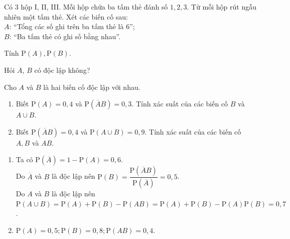 \begin{baitap}%
	Có $3$ hộp I, II, III. Mỗi hộp chứa ba tấm thẻ đánh số $1,2,3$. Từ mỗi hộp rút ngẫu nhiên một tấm thẻ. Xét các biến cố sau:\\
	$A$: ``Tổng các số ghi trên ba tấm thẻ là $6$'';\\
	$B$: ``Ba tấm thẻ có ghi số bằng nhau''.
	\begin{listEX}
		\item Tính $\mathrm{P}(A), \mathrm{P}(B)$.
		\item Hỏi $A$, $B$ có độc lập không?
	\end{listEX}
\end{baitap} 


\begin{baitap}%
	Cho $A$ và $B$ là hai biến cố độc lập với nhau.
	\begin{enumerate}
		\item Biết $\mathrm{P}(A)=0,4$ và $\mathrm{P}(\overline{A} B)=0,3$. Tính xác suất của các biến cố $B$ và $A\cup B$.
		\item Biết $\mathrm{P}(\overline{A} B)=0,4$ và $\mathrm{P}(A\cup B)=0,9$. Tính xác suất của các biến cố $A,B$ và $AB$.
	\end{enumerate}
	\loigiai
	{
		\begin{enumerate}
			\item Ta có $\mathrm{P}(\overline{A})=1-\mathrm{P}(A)=0,6$.\\
			Do $\overline{A}$ và $B$ là độc lập nên $\mathrm{P}(B)=\dfrac{\mathrm{P}(\overline{A} B)}{\mathrm{P}(\overline{A})}=0,5$.\\
			Do $A$ và $B$ là độc lập nên 
			$\mathrm{P}(A\cup B)=\mathrm{P}(A)+\mathrm{P}(B)-\mathrm{P}(AB)=\mathrm{P}(A)+\mathrm{P}(B)-\mathrm{P}(A) \mathrm{P}(B)=0,7$.
			\item $\mathrm{P}(A)=0,5;\mathrm{P}(B)=0,8;\mathrm{P}(AB)=0,4$.
		\end{enumerate}
	}
\end{baitap} 

